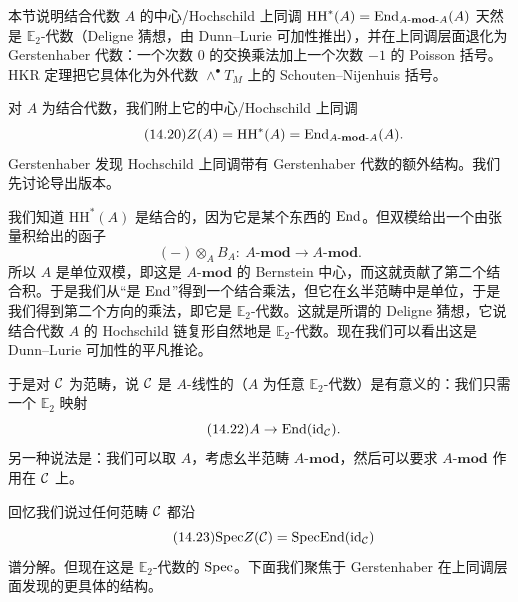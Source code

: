 \begin{sectionkey}
本节说明结合代数 $A$ 的中心/Hochschild 上同调 $\mathrm{HH}^*(A)=\mathrm{End}_{A\text{-}\mathbf{mod}\text{-}A}(A)$ 天然是 $\mathbb{E}_2$-代数（Deligne 猜想，由 Dunn–Lurie 可加性推出），并在上同调层面退化为 Gerstenhaber 代数：一个次数 0 的交换乘法加上一个次数 $-1$ 的 Poisson 括号。HKR 定理把它具体化为外代数 $\wedge^\bullet T_M$ 上的 Schouten–Nijenhuis 括号。
\end{sectionkey}

对 $A$ 为结合代数，我们附上它的中心/Hochschild 上同调
\begin{equation}\tag{14.20}
Z(A)=\mathrm{HH}^*(A)=\mathrm{End}_{A\text{-}\mathbf{mod}\text{-}A}(A).
\end{equation}
Gerstenhaber 发现 Hochschild 上同调带有 Gerstenhaber 代数的额外结构。我们先讨论导出版本。

我们知道 $\mathrm{HH}^*(A)$ 是结合的，因为它是某个东西的 $\mathrm{End}$。但双模给出一个由张量积给出的函子
\begin{equation}\tag{14.21}
(-)\otimes_A B_A:\ A\text{-}\mathbf{mod}\to A\text{-}\mathbf{mod}.
\end{equation}
所以 $A$ 是单位双模，即这是 $A\text{-}\mathbf{mod}$ 的 Bernstein 中心，而这就贡献了第二个结合积。于是我们从“是 $\mathrm{End}$”得到一个结合乘法，但它在幺半范畴中是单位，于是我们得到第二个方向的乘法，即它是 $\mathbb{E}_2$-代数。这就是所谓的 Deligne 猜想，它说结合代数 $A$ 的 Hochschild 链复形自然地是 $\mathbb{E}_2$-代数。现在我们可以看出这是 Dunn–Lurie 可加性的平凡推论。

于是对 $\mathcal{C}$ 为范畴，说 $\mathcal{C}$ 是 $A$-线性的（$A$ 为任意 $\mathbb{E}_2$-代数）是有意义的：我们只需一个 $\mathbb{E}_2$ 映射
\begin{equation}\tag{14.22}
A\to\mathrm{End}(\mathrm{id}_{\mathcal{C}}).
\end{equation}
另一种说法是：我们可以取 $A$，考虑幺半范畴 $A\text{-}\mathbf{mod}$，然后可以要求 $A\text{-}\mathbf{mod}$ 作用在 $\mathcal{C}$ 上。

回忆我们说过任何范畴 $\mathcal{C}$ 都沿
\begin{equation}\tag{14.23}
\mathrm{Spec} Z(\mathcal{C})=\mathrm{Spec}\mathrm{End}(\mathrm{id}_{\mathcal{C}})
\end{equation}
谱分解。但现在这是 $\mathbb{E}_2$-代数的 $\mathrm{Spec}$。下面我们聚焦于 Gerstenhaber 在上同调层面发现的更具体的结构。

